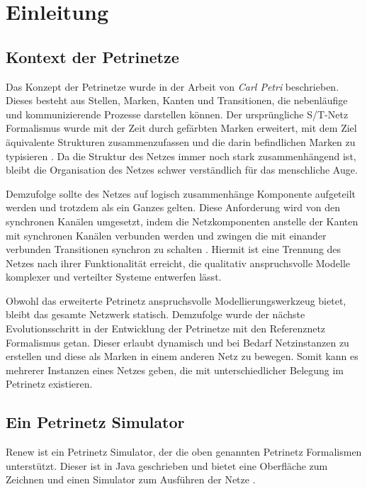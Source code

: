 \chapter{Einleitung}

\section{Kontext der Petrinetze} \label{sec:KdP} 

Das Konzept der Petrinetze wurde in der Arbeit von \textit{Carl Petri} beschrieben. Dieses besteht aus Stellen, Marken, Kanten und Transitionen, die nebenläufige und kommunizierende Prozesse darstellen können. Der ursprüngliche S/T-Netz Formalismus wurde mit der Zeit durch gefärbten Marken erweitert, mit dem Ziel äquivalente Strukturen zusammenzufassen und die darin befindlichen Marken zu typisieren \cite{kummerReferenznetze}. Da die Struktur des Netzes immer noch stark zusammenhängend ist, bleibt die Organisation des Netzes schwer verständlich für das menschliche Auge.\bigbreak

Demzufolge sollte des Netzes auf logisch zusammenhänge Komponente aufgeteilt werden und trotzdem als ein Ganzes gelten. Diese Anforderung wird von den synchronen Kanälen umgesetzt, indem die Netzkomponenten anstelle der Kanten mit synchronen Kanälen verbunden werden und zwingen die mit einander verbunden Transitionen synchron zu schalten \cite{kummerReferenznetze}. Hiermit ist eine Trennung des Netzes nach ihrer Funktionalität erreicht, die qualitativ anspruchsvolle Modelle komplexer und verteilter Systeme entwerfen lässt.\bigbreak

Obwohl das erweiterte Petrinetz anspruchsvolle Modellierungswerkzeug bietet, bleibt das gesamte Netzwerk statisch. Demzufolge wurde der nächste Evolutionsschritt in der Entwicklung der Petrinetze mit den Referenznetz Formalismus getan. Dieser erlaubt dynamisch und bei Bedarf Netzinstanzen zu erstellen und diese als Marken in einem anderen Netz zu bewegen. Somit kann es mehrerer Instanzen eines Netzes geben, die mit unterschiedlicher Belegung im Petrinetz existieren\cite{kummerReferenznetze}.

\section{Ein Petrinetz Simulator} \label{sec:EPS}

Renew ist ein Petrinetz Simulator, der die oben genannten Petrinetz Formalismen unterstützt. Dieser ist in Java geschrieben und bietet eine Oberfläche zum Zeichnen und einen Simulator zum Ausführen der Netze \cite{userGuide}.\bigbreak

